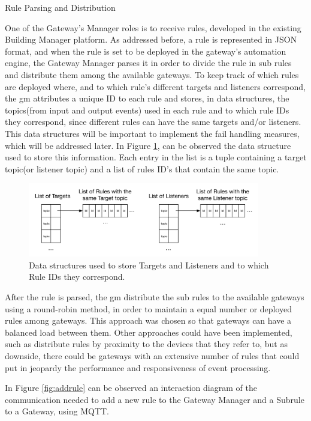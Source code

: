 \begin{Paragraph}{Rule Parsing and Distribution}
	
One of the Gateway's Manager roles is to receive rules, developed in the existing Building Manager platform. As addressed before, a rule is represented in JSON format, and when the rule is set to be deployed in the gateway's automation engine, the Gateway Manager parses it in order to divide the rule in sub rules and distribute them among the available gateways. To keep track of which rules are deployed where, and to which rule's different targets and listeners correspond, the \ac{gm} attributes a unique ID to each rule and stores, in data structures, the topics(from input and output events) used in each rule and to which rule IDs they correspond, since different rules can have the same targets and/or listeners. This data structures will be important to implement the fail handling measures, which will be addressed later. In Figure \ref{fig:parser_struct}, can be observed the data structure used to store this information. Each entry in the list is a tuple containing a target topic(or listener topic) and a list of rules ID's that contain the same topic.

\begin{figure}[H]
	\centering
	\includegraphics[width=0.9\textwidth]{figures/parser_struct.png}
	\caption{Data structures used to store Targets and Listeners and to which Rule IDs they correspond.}
	\label{fig:parser_struct}
\end{figure}

After the rule is parsed, the \ac{gm} distribute the sub rules to the available gateways using a round-robin method, in order to maintain a equal number or deployed rules among gateways. This approach was chosen so that gateways can have a balanced load between them. Other approaches could have been implemented, such as distribute rules by proximity to the devices that they refer to, but as downside, there could be gateways with an extensive number of rules that could put in jeopardy the performance and responsiveness of event processing. 

In Figure \ref{fig:addrule} can be observed an interaction diagram of the communication needed to add a new rule to the Gateway Manager and a Subrule to a Gateway, using MQTT.


\end{Paragraph}
